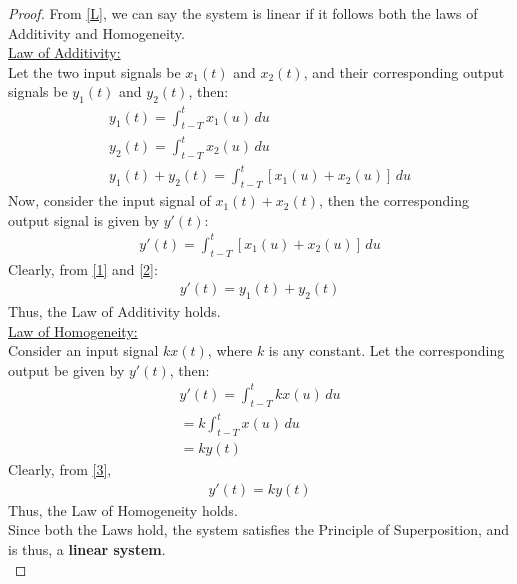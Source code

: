 \documentclass[journal,12pt,twocolumn]{IEEEtran}
\begin{document}
\begin{proof} 
From \eqref{L}, we can say the system is linear if it follows both the laws of Additivity and Homogeneity.\\
\underline{Law of Additivity:}\\
Let the two input signals be $x_1(t)$ and $x_2(t)$, and their corresponding output signals be $y_1(t)$ and $y_2(t)$, then:
\begin{align}
    y_1(t) = \int_{t-T}^tx_1(u)\,du\\
    y_2(t) = \int_{t-T}^tx_2(u)\,du\\
    y_1(t) + y_2(t) = \int_{t-T}^t[x_1(u) + x_2(u)]\,du
    \label{1}
\end{align}
Now, consider the input signal of $x_1(t) + x_2(t)$, then the corresponding output signal is given by $y'(t)$:
\begin{align}
    y'(t) = \int_{t-T}^t[x_1(u) + x_2(u)]\,du
    \label{2}
\end{align}
Clearly, from \eqref{1} and \eqref{2}:
\begin{align}
    y'(t) = y_1(t) + y_2(t)
\end{align}
Thus, the Law of Additivity holds.\\

\underline{Law of Homogeneity: }\\
Consider an input signal $kx(t)$, where $k$ is any constant. Let the corresponding output be given by $y'(t)$, then:
\begin{align}
    y'(t) = \int_{t-T}^t kx(u)\,du\\
    = k\int_{t-T}^t x(u)\,du\\
     = ky(t)
     \label{3}
\end{align}
Clearly, from \eqref{3},
\begin{align}
    y'(t) = ky(t)
\end{align}
Thus, the Law of Homogeneity holds.\\

Since both the Laws hold, the system satisfies the Principle of Superposition, and is thus, a \textbf{linear system}.\\


\end{proof}
\end{document}
